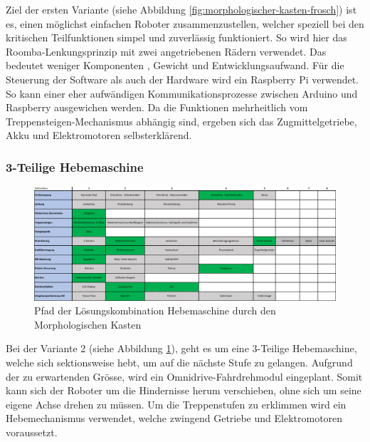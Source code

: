 Ziel der ersten Variante (siehe Abbildung \ref{fig:morphologischer-kasten-frosch}) ist es, einen möglichst einfachen Roboter zusammenzustellen, welcher speziell bei den kritischen Teilfunktionen simpel und zuverlässig funktioniert. So wird hier das Roomba-Lenkungsprinzip mit zwei angetriebenen Rädern verwendet. Das bedeutet weniger Komponenten , Gewicht und Entwicklungsaufwand. 
Für die  Steuerung der Software als auch der Hardware wird ein Raspberry Pi verwendet. So kann einer eher aufwändigen Kommunikationsprozesse zwischen Arduino und Raspberry ausgewichen werden. 
Da die Funktionen mehrheitlich vom Treppensteigen-Mechanismus abhängig sind, ergeben sich das Zugmittelgetriebe, Akku und Elektromotoren selbsterklärend. 

\subsubsection*{3-Teilige Hebemaschine}
\begin{figure}[H]
  \includegraphics[width=1.0\textwidth]{img/morphologische-kaesten/Morphologischer_Kasten_Hebe}
  \centering
  \caption{Pfad der Lösungskombination Hebemaschine durch den Morphologischen Kasten}
  \label{fig:morphologischer-kasten-3teiler}
\end{figure}
   
Bei der Variante 2 (siehe Abbildung \ref{fig:morphologischer-kasten-3teiler}), geht es um eine 3-Teilige Hebemaschine, welche sich sektionsweise hebt, um auf die nächste Stufe zu gelangen. Aufgrund der zu erwartenden Grösse, wird ein Omnidrive-Fahrdrehmodul eingeplant. Somit kann sich der Roboter um die Hindernisse herum verschieben, ohne sich um seine eigene Achse drehen zu müssen. Um die Treppenstufen zu erklimmen wird ein Hebemechanismus verwendet, welche zwingend Getriebe und Elektromotoren voraussetzt.

